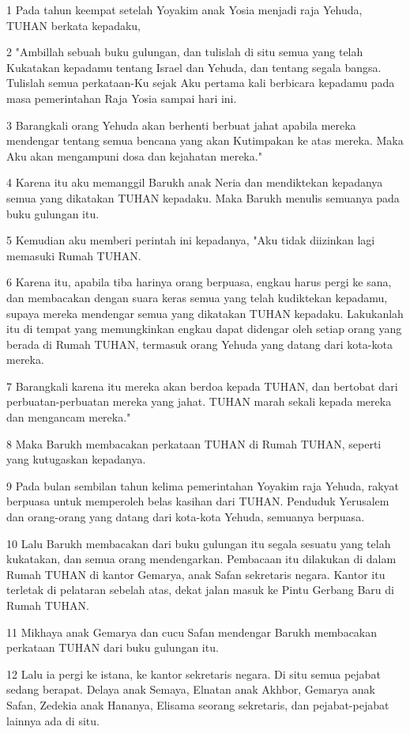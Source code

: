 \par 1 Pada tahun keempat setelah Yoyakim anak Yosia menjadi raja Yehuda, TUHAN berkata kepadaku,
\par 2 "Ambillah sebuah buku gulungan, dan tulislah di situ semua yang telah Kukatakan kepadamu tentang Israel dan Yehuda, dan tentang segala bangsa. Tulislah semua perkataan-Ku sejak Aku pertama kali berbicara kepadamu pada masa pemerintahan Raja Yosia sampai hari ini.
\par 3 Barangkali orang Yehuda akan berhenti berbuat jahat apabila mereka mendengar tentang semua bencana yang akan Kutimpakan ke atas mereka. Maka Aku akan mengampuni dosa dan kejahatan mereka."
\par 4 Karena itu aku memanggil Barukh anak Neria dan mendiktekan kepadanya semua yang dikatakan TUHAN kepadaku. Maka Barukh menulis semuanya pada buku gulungan itu.
\par 5 Kemudian aku memberi perintah ini kepadanya, "Aku tidak diizinkan lagi memasuki Rumah TUHAN.
\par 6 Karena itu, apabila tiba harinya orang berpuasa, engkau harus pergi ke sana, dan membacakan dengan suara keras semua yang telah kudiktekan kepadamu, supaya mereka mendengar semua yang dikatakan TUHAN kepadaku. Lakukanlah itu di tempat yang memungkinkan engkau dapat didengar oleh setiap orang yang berada di Rumah TUHAN, termasuk orang Yehuda yang datang dari kota-kota mereka.
\par 7 Barangkali karena itu mereka akan berdoa kepada TUHAN, dan bertobat dari perbuatan-perbuatan mereka yang jahat. TUHAN marah sekali kepada mereka dan mengancam mereka."
\par 8 Maka Barukh membacakan perkataan TUHAN di Rumah TUHAN, seperti yang kutugaskan kepadanya.
\par 9 Pada bulan sembilan tahun kelima pemerintahan Yoyakim raja Yehuda, rakyat berpuasa untuk memperoleh belas kasihan dari TUHAN. Penduduk Yerusalem dan orang-orang yang datang dari kota-kota Yehuda, semuanya berpuasa.
\par 10 Lalu Barukh membacakan dari buku gulungan itu segala sesuatu yang telah kukatakan, dan semua orang mendengarkan. Pembacaan itu dilakukan di dalam Rumah TUHAN di kantor Gemarya, anak Safan sekretaris negara. Kantor itu terletak di pelataran sebelah atas, dekat jalan masuk ke Pintu Gerbang Baru di Rumah TUHAN.
\par 11 Mikhaya anak Gemarya dan cucu Safan mendengar Barukh membacakan perkataan TUHAN dari buku gulungan itu.
\par 12 Lalu ia pergi ke istana, ke kantor sekretaris negara. Di situ semua pejabat sedang berapat. Delaya anak Semaya, Elnatan anak Akhbor, Gemarya anak Safan, Zedekia anak Hananya, Elisama seorang sekretaris, dan pejabat-pejabat lainnya ada di situ.
